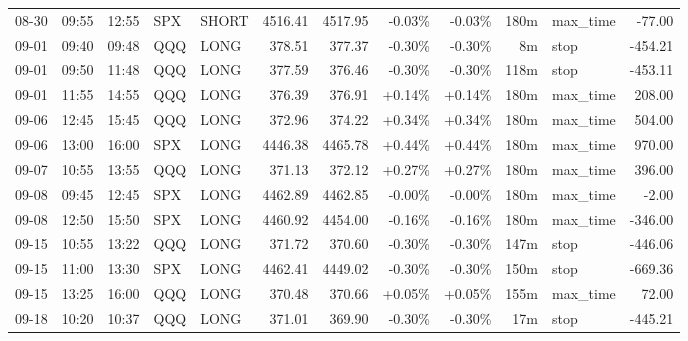 \documentclass[11pt,a4paper,twoside]{article}
\begin{document}
\begin{center}
\begin{longtable}{>{\color{txtmain}}l l l l l r r r r r >{\color{txtmain}}l r}
08-30 & 09:55 & 12:55 & SPX & SHORT & 4516.41 & 4517.95 & \textcolor{lossred}{-0.03\%} & \textcolor{lossred}{-0.03\%} & 180m & max\_time & \textcolor{lossred}{-77.00} \\
09-01 & 09:40 & 09:48 & QQQ & LONG & 378.51 & 377.37 & \textcolor{lossred}{-0.30\%} & \textcolor{lossred}{-0.30\%} & 8m & stop & \textcolor{lossred}{-454.21} \\
09-01 & 09:50 & 11:48 & QQQ & LONG & 377.59 & 376.46 & \textcolor{lossred}{-0.30\%} & \textcolor{lossred}{-0.30\%} & 118m & stop & \textcolor{lossred}{-453.11} \\
09-01 & 11:55 & 14:55 & QQQ & LONG & 376.39 & 376.91 & \textcolor{wingreen}{+0.14\%} & \textcolor{wingreen}{+0.14\%} & 180m & max\_time & \textcolor{wingreen}{208.00} \\
09-06 & 12:45 & 15:45 & QQQ & LONG & 372.96 & 374.22 & \textcolor{wingreen}{+0.34\%} & \textcolor{wingreen}{+0.34\%} & 180m & max\_time & \textcolor{wingreen}{504.00} \\
09-06 & 13:00 & 16:00 & SPX & LONG & 4446.38 & 4465.78 & \textcolor{wingreen}{+0.44\%} & \textcolor{wingreen}{+0.44\%} & 180m & max\_time & \textcolor{wingreen}{970.00} \\
09-07 & 10:55 & 13:55 & QQQ & LONG & 371.13 & 372.12 & \textcolor{wingreen}{+0.27\%} & \textcolor{wingreen}{+0.27\%} & 180m & max\_time & \textcolor{wingreen}{396.00} \\
09-08 & 09:45 & 12:45 & SPX & LONG & 4462.89 & 4462.85 & \textcolor{lossred}{-0.00\%} & \textcolor{lossred}{-0.00\%} & 180m & max\_time & \textcolor{lossred}{-2.00} \\
09-08 & 12:50 & 15:50 & SPX & LONG & 4460.92 & 4454.00 & \textcolor{lossred}{-0.16\%} & \textcolor{lossred}{-0.16\%} & 180m & max\_time & \textcolor{lossred}{-346.00} \\
09-15 & 10:55 & 13:22 & QQQ & LONG & 371.72 & 370.60 & \textcolor{lossred}{-0.30\%} & \textcolor{lossred}{-0.30\%} & 147m & stop & \textcolor{lossred}{-446.06} \\
09-15 & 11:00 & 13:30 & SPX & LONG & 4462.41 & 4449.02 & \textcolor{lossred}{-0.30\%} & \textcolor{lossred}{-0.30\%} & 150m & stop & \textcolor{lossred}{-669.36} \\
09-15 & 13:25 & 16:00 & QQQ & LONG & 370.48 & 370.66 & \textcolor{wingreen}{+0.05\%} & \textcolor{wingreen}{+0.05\%} & 155m & max\_time & \textcolor{wingreen}{72.00} \\
09-18 & 10:20 & 10:37 & QQQ & LONG & 371.01 & 369.90 & \textcolor{lossred}{-0.30\%} & \textcolor{lossred}{-0.30\%} & 17m & stop & \textcolor{lossred}{-445.21} \\

\end{longtable}
\end{center}
\end{document}
